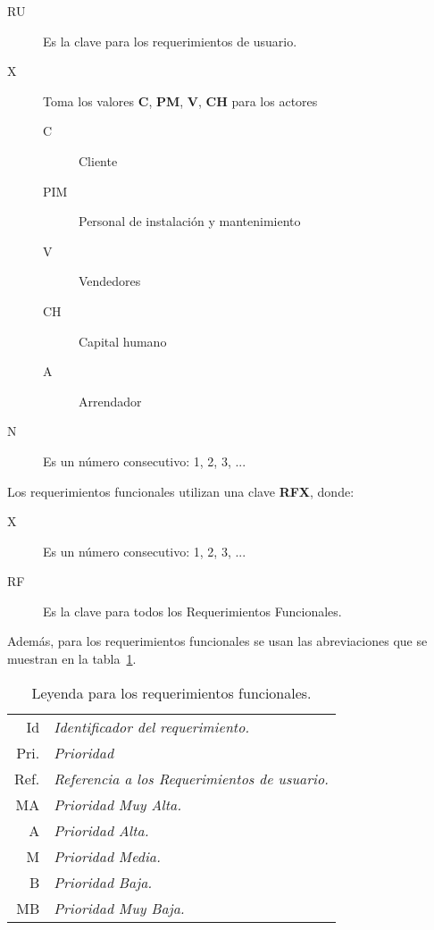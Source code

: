 \begin{description}
    \item[RU] Es la clave para los requerimientos de usuario.
	\item[X] Toma los valores \textbf{C}, \textbf{PM}, \textbf{V}, \textbf{CH} para los actores
	\begin{description}
	    \item[C] Cliente
	    \item[PIM] Personal de instalación y mantenimiento
	    \item[V] Vendedores
	    \item[CH] Capital humano
	    \item[A] Arrendador
	\end{description}
	\item[N] Es un número consecutivo: 1, 2, 3, ...
\end{description}
Los requerimientos funcionales utilizan una clave \textbf{RFX}, donde:
\begin{description}
    \item[X] Es un número consecutivo: 1, 2, 3, ...
    \item[RF] Es la clave para todos los Requerimientos Funcionales.
\end{description}
	Además, para los requerimientos funcionales se usan las abreviaciones que se muestran en la tabla~\ref{tbl:leyendaRF}.
\begin{table}[hbtp!]
	\begin{center}
    \begin{tabular}{|r l|}
	    \hline
    	{\footnotesize Id} & {\footnotesize\em Identificador del requerimiento.}\\
    	{\footnotesize Pri.} & {\footnotesize\em Prioridad}\\
    	{\footnotesize Ref.} & {\footnotesize\em Referencia a los Requerimientos de usuario.}\\
    	{\footnotesize MA} & {\footnotesize\em Prioridad Muy Alta.}\\
    	{\footnotesize A} & {\footnotesize\em Prioridad Alta.}\\
    	{\footnotesize M} & {\footnotesize\em Prioridad Media.}\\
    	{\footnotesize B} & {\footnotesize\em Prioridad Baja.}\\
    	{\footnotesize MB} & {\footnotesize\em Prioridad Muy Baja.}\\
		\hline
    \end{tabular} 
    \caption{Leyenda para los requerimientos funcionales.}
    \label{tbl:leyendaRF}
	\end{center}
\end{table}